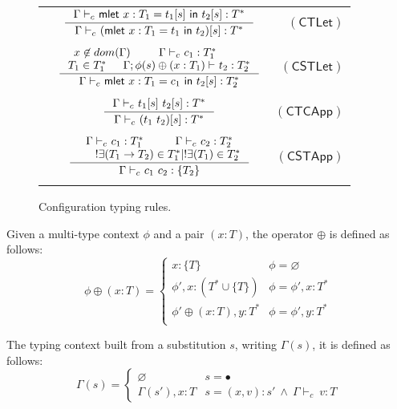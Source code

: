 \documentclass[preprint,authoryear,sort&compress,9pt,nocopyrightspace]{article}
\newcommand\rulename[1]{\mathsf{(#1)}}
\newcommand{\conf}[2][s]{(#2)[#1]}
\newcommand{\tyC}{{\Gamma \vdash_c \ }}
\newcommand{\enveC}{{\Gamma ;  \emt(s) \oplus (x : T_1) \vdash \ }}
\newcommand{\appD}{t_1 \ t_2}
\newcommand{\oletPT}[3]{\mathsf{mlet} \ x : #1 = #2 \ \mathsf{in}  \ #3}
\newcommand{\mtD}{T^{*}}
\newcommand{\mtP}[1]{#1^{*}}
\newcommand{\mtCu}[1]{\{ #1 \}}
\newcommand{\emt}{\phi}
\begin{document}
\begin{figure}
\begin{small}
\begin{center}
\begin{tabular}{|l c r|}
&$\inference{\tyC \oletPT{T_1}{t_1[s]}{t_2[s] : \mtP{T}}}{\tyC \conf{\oletPT{T_1}{t_1}{t_2}} : \mtP{T}}$&$\rulename{CTLet}$\\
&&\\
&$\inference{x \not \in dom(\Gamma) & \tyC c_1 : \mtP{T_1}  & \\ T_1 \in  \mtP{T_1}& \enveC t_2 : \mtP{T_2}}{\tyC \oletPT{T_1}{c_1}{t_2[s]} : \mtP{T_2}}$&$\rulename{CSTLet}$\\
&&\\
&$\inference {\tyC t_1[s] \ t_2[s] : \mtP{T}}{\tyC \conf{\appD} : \mtP{T}}$&$\rulename{CTCApp}$\\
&&\\
&$\inference {\tyC c_1 : T_1^{*} & \tyC c_2 : T_2^{*}  \\ & !\exists(T_1 \to T_2) \in T_1^{*}| !\exists(T_1) \in T_2^{*}}{\tyC c_1 \ c_2 : \{T_2\}}$&$\rulename{CSTApp}$\\
&&\\
\hline
\end{tabular}
\hspace*{-2.8cm}
\caption{Configuration typing rules.}
\label{tabla:confugurationtypingrule}
\end{center}

\end{small}
\end{figure}

\begin{definition}[$\oplus$]
\label{definition:tcs}
\mbox{}
Given a multi-type context $\emt$ and a pair $(x:T)$, the operator $\oplus$ is defined  as follows:
\[ \emt \oplus (x:T) = \begin{cases} 
      x:\mtCu{T}& \emt =  \varnothing \\
      \emt',x:(\mtD \cup \mtCu{T}) & \emt = \emt',x:\mtD\\
      \emt' \oplus (x:T),y:\mtD & \emt = \emt',y:\mtD\\
   \end{cases}
\]
\end{definition}

\begin{definition}[$\Gamma(s)$]
\label{definition:tcs}
\mbox{}
The typing context built from a substitution $s$, writing $\Gamma(s)$, it is defined as follows:
\[ \Gamma(s) = \begin{cases} 
     \varnothing & s =  \bullet \\
      \Gamma(s'), x:T & s = (x,v):s' \ \land \ \tyC v : T 
   \end{cases}
\]
\end{definition}
\end{document}
